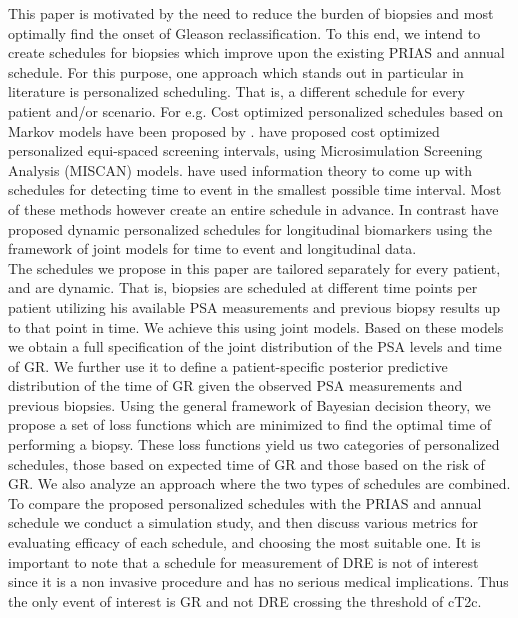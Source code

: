 This paper is motivated by the need to reduce the burden of biopsies and most optimally find the onset of Gleason reclassification. To this end, we intend to create schedules for biopsies which improve upon the existing PRIAS and annual schedule. For this purpose, one approach which stands out in particular in literature is personalized scheduling. That is, a different schedule for every patient and/or scenario. For e.g. Cost optimized personalized schedules based on Markov models have been proposed by \cite{bebu2017OptimalScreening}. \cite{oMahonyOptimaInterval} have proposed cost optimized personalized equi-spaced screening intervals, using Microsimulation Screening Analysis (MISCAN) models. \cite{parmigiani1998designing} have used information theory to come up with schedules for detecting time to event in the smallest possible time interval. Most of these methods however create an entire schedule in advance. In contrast \cite{drizopoulosPersScreening} have proposed dynamic personalized schedules for longitudinal biomarkers using the framework of joint models for time to event and longitudinal data\citep{tsiatis2004joint,rizopoulos2012joint}.\\

The schedules we propose in this paper are tailored separately for every patient, and are dynamic. That is, biopsies are scheduled at different time points per patient utilizing his available PSA measurements and previous biopsy results up to that point in time. We achieve this using joint models. Based on these models we obtain a full specification of the joint distribution of the PSA levels and time of GR. We further use it to define a patient-specific posterior predictive distribution of the time of GR given the observed PSA measurements and previous biopsies. Using the general framework of Bayesian decision theory, we propose a set of loss functions which are minimized to find the optimal time of performing a biopsy. These loss functions yield us two categories of personalized schedules, those based on expected time of GR and those based on the risk of GR. We also analyze an approach where the two types of schedules are combined. To compare the proposed personalized schedules with the PRIAS and annual schedule we conduct a simulation study, and then discuss various metrics for evaluating efficacy of each schedule, and choosing the most suitable one. It is important to note that a schedule for measurement of DRE is not of interest since it is a non invasive procedure and has no serious medical implications. Thus the only event of interest is GR and not DRE crossing the threshold of cT2c.\\

